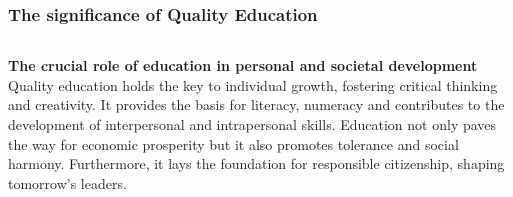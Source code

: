 \documentclass[5pt]{beamer}
\begin{document}
\begin{frame}
\frametitle{The significance of Quality Education}
\begin{columns}
\begin{column}{0.7\textwidth}
\begin{block}{\textbf{The crucial role of education in personal and societal development}}
Quality education holds the key to individual growth, fostering critical thinking and creativity. It provides the basis for literacy, numeracy and contributes to the development of interpersonal and intrapersonal skills. Education not only paves the way for economic prosperity but it also promotes tolerance and social harmony. Furthermore, it lays the foundation for responsible citizenship, shaping tomorrow's leaders.
\end{block}
\end{column}
\end{columns}
\end{frame}
\end{document}
